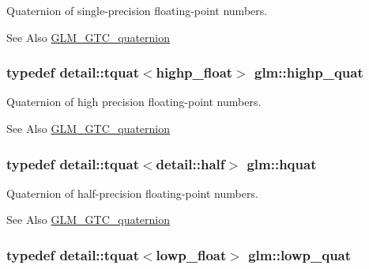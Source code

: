 Quaternion of single-\/precision floating-\/point numbers. 

\begin{DoxySeeAlso}{See Also}
\hyperlink{group__gtc__quaternion}{G\-L\-M\-\_\-\-G\-T\-C\-\_\-quaternion} 
\end{DoxySeeAlso}
\hypertarget{group__gtc__quaternion_ga86a81668075e0896b7d6cd395d1d01ec}{
\subsubsection[{highp\-\_\-quat}]{\setlength{\rightskip}{0pt plus 5cm}typedef detail\-::tquat$<$highp\-\_\-float$>$ {\bf glm\-::highp\-\_\-quat}}}\label{group__gtc__quaternion_ga86a81668075e0896b7d6cd395d1d01ec}


Quaternion of high precision floating-\/point numbers. 

\begin{DoxySeeAlso}{See Also}
\hyperlink{group__gtc__quaternion}{G\-L\-M\-\_\-\-G\-T\-C\-\_\-quaternion} 
\end{DoxySeeAlso}
\hypertarget{group__gtc__quaternion_ga9601a7ab2375426d8f302f0be9507586}{
\subsubsection[{hquat}]{\setlength{\rightskip}{0pt plus 5cm}typedef detail\-::tquat$<$detail\-::half$>$ {\bf glm\-::hquat}}}\label{group__gtc__quaternion_ga9601a7ab2375426d8f302f0be9507586}


Quaternion of half-\/precision floating-\/point numbers. 

\begin{DoxySeeAlso}{See Also}
\hyperlink{group__gtc__quaternion}{G\-L\-M\-\_\-\-G\-T\-C\-\_\-quaternion} 
\end{DoxySeeAlso}
\hypertarget{group__gtc__quaternion_ga0754d8cacc7c48dd300ea7cd2846d1d8}{
\subsubsection[{lowp\-\_\-quat}]{\setlength{\rightskip}{0pt plus 5cm}typedef detail\-::tquat$<$lowp\-\_\-float$>$ {\bf glm\-::lowp\-\_\-quat}}}\label{group__gtc__quaternion_ga0754d8cacc7c48dd300ea7cd2846d1d8}


